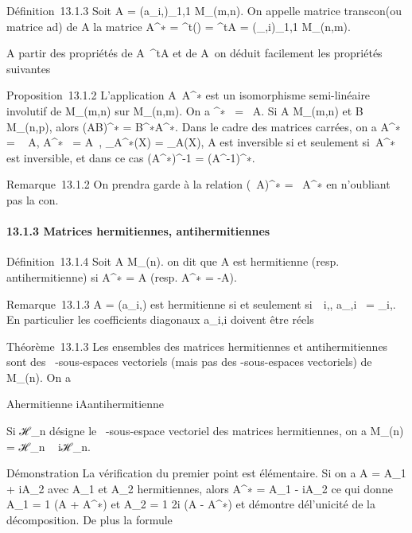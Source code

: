 \documentclass[]{article}
\begin{document}
Définition~13.1.3 Soit A = (a\_i,\jmath)\_1\leqi\leqm,1\leq\jmath\leqn \in
M\_(m,n). On appelle matrice transcon (ou matrice
ad\jmathointe) de A la matrice A^∗ =
^t(\overlineA) =
\overline^tA =
(\overlinea\_\jmath,i)\_1\leqi\leqm,1\leq\jmath\leqn \in
M\_(n,m).

A partir des propriétés de A\mapsto~^tA
et de A\mapsto~\overlineA on
déduit facilement les propriétés suivantes

Proposition~13.1.2 L'application
A\mapsto~A^∗ est un isomorphisme
semi-linéaire involutif de M\_(m,n) sur M\_(n,m). On a
\mathrmrgA^∗~
= \mathrmrg~A. Si A \in
M\_(m,n) et B \in M\_(n,p), alors (AB)^∗ =
B^∗A^∗. Dans le cadre des matrices carrées, on a
 A^∗~ =
\overline{}~
A,
A^∗~ =
\overline{}A~,
\chi\_A^∗(X) =
\overline\chi\_A(X), A est inversible si et
seulement si~A^∗ est inversible, et dans ce cas
(A^∗)^-1 = (A^-1)^∗.

Remarque~13.1.2 On prendra garde à la relation (\lambda~A)^∗ =
\overline\lambda~A^∗ en n'oubliant pas la
con\jmathugaison.

\paragraph{13.1.3 Matrices hermitiennes, antihermitiennes}

Définition~13.1.4 Soit A \in M\_(n). on dit que A est hermitienne
(resp. antihermitienne) si A^∗ = A (resp. A^∗ =
-A).

Remarque~13.1.3 A = (a\_i,\jmath) est hermitienne si et seulement
si~\forall~i,\jmath, a\_\jmath,i~ =
\overlinea\_i,\jmath. En particulier les
coefficients diagonaux a\_i,i doivent être réels

Théorème~13.1.3 Les ensembles des matrices hermitiennes et
antihermitiennes sont des ~-sous-espaces vectoriels (mais pas des
-sous-espaces vectoriels) de M\_(n). On a

A\text hermitienne  \Leftrightarrow
iA\text antihermitienne

Si ℋ\_n désigne le ~-sous-espace vectoriel des matrices
hermitiennes, on a M\_(n) = ℋ\_n \oplus~ iℋ\_n.

Démonstration La vérification du premier point est élémentaire. Si on a
A = A\_1 + iA\_2 avec A\_1 et A\_2
hermitiennes, alors A^∗ = A\_1 - iA\_2 ce qui
donne A\_1 = 1  (A + A^∗)
et A\_2 = 1 \over 2i (A - A^∗) et
démontre dé l'unicité de la décomposition. De plus la formule
\end{document}
